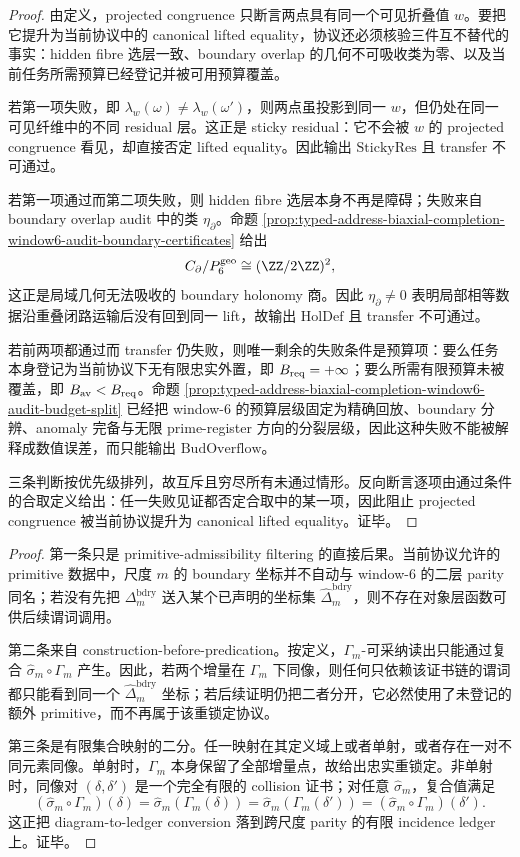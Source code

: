 \begin{proof}
由定义，projected congruence 只断言两点具有同一个可见折叠值 \(w\)。要把它提升为当前协议中的 canonical lifted equality，协议还必须核验三件互不替代的事实：hidden fibre 选层一致、boundary overlap 的几何不可吸收类为零、以及当前任务所需预算已经登记并被可用预算覆盖。

若第一项失败，即
\(\lambda_w(\omega)\ne\lambda_w(\omega')\)，则两点虽投影到同一 \(w\)，但仍处在同一可见纤维中的不同 residual 层。这正是 sticky residual：它不会被 \(w\) 的 projected congruence 看见，却直接否定 lifted equality。因此输出 \(\mathrm{StickyRes}\) 且 transfer 不可通过。

若第一项通过而第二项失败，则 hidden fibre 选层本身不再是障碍；失败来自 boundary overlap audit 中的类
\(\eta_\partial\)。命题
\ref{prop:typed-address-biaxial-completion-window6-audit-boundary-certificates}
给出
\[
C_{\partial}/P_6^{\mathrm{geo}}\cong(\ZZ/2\ZZ)^2,
\]
这正是局域几何无法吸收的 boundary holonomy 商。因此 \(\eta_\partial\ne0\) 表明局部相等数据沿重叠闭路运输后没有回到同一 lift，故输出 \(\mathrm{HolDef}\) 且 transfer 不可通过。

若前两项都通过而 transfer 仍失败，则唯一剩余的失败条件是预算项：要么任务本身登记为当前协议下无有限忠实外置，即
\(B_{\rm req}=+\infty\)；要么所需有限预算未被覆盖，即
\(B_{\rm av}<B_{\rm req}\)。命题
\ref{prop:typed-address-biaxial-completion-window6-audit-budget-split}
已经把 window-\(6\) 的预算层级固定为精确回放、boundary 分辨、anomaly 完备与无限 prime-register 方向的分裂层级，因此这种失败不能被解释成数值误差，而只能输出 \(\mathrm{BudOverflow}\)。

三条判断按优先级排列，故互斥且穷尽所有未通过情形。反向断言逐项由通过条件的合取定义给出：任一失败见证都否定合取中的某一项，因此阻止 projected congruence 被当前协议提升为 canonical lifted equality。证毕。
\end{proof}

\begin{proof}
第一条只是 primitive-admissibility filtering 的直接后果。当前协议允许的 primitive 数据中，尺度 \(m\) 的 boundary 坐标并不自动与 window-\(6\) 的二层 parity 同名；若没有先把 \(\Delta_m^{\mathrm{bdry}}\) 送入某个已声明的坐标集 \(\widehat\Delta_m^{\mathrm{bdry}}\)，则不存在对象层函数可供后续谓词调用。

第二条来自 construction-before-predication。按定义，\(\Gamma_m\)-可采纳读出只能通过复合 \(\widehat\sigma_m\circ\Gamma_m\) 产生。因此，若两个增量在 \(\Gamma_m\) 下同像，则任何只依赖该证书链的谓词都只能看到同一个 \(\widehat\Delta_m^{\mathrm{bdry}}\) 坐标；若后续证明仍把二者分开，它必然使用了未登记的额外 primitive，而不再属于该重锁定协议。

第三条是有限集合映射的二分。任一映射在其定义域上或者单射，或者存在一对不同元素同像。单射时，\(\Gamma_m\) 本身保留了全部增量点，故给出忠实重锁定。非单射时，同像对 \((\delta,\delta')\) 是一个完全有限的 collision 证书；对任意 \(\widehat\sigma_m\)，复合值满足
\[
(\widehat\sigma_m\circ\Gamma_m)(\delta)
=
\widehat\sigma_m(\Gamma_m(\delta))
=
\widehat\sigma_m(\Gamma_m(\delta'))
=
(\widehat\sigma_m\circ\Gamma_m)(\delta').
\]
这正把 diagram-to-ledger conversion 落到跨尺度 parity 的有限 incidence ledger 上。证毕。
\end{proof}

